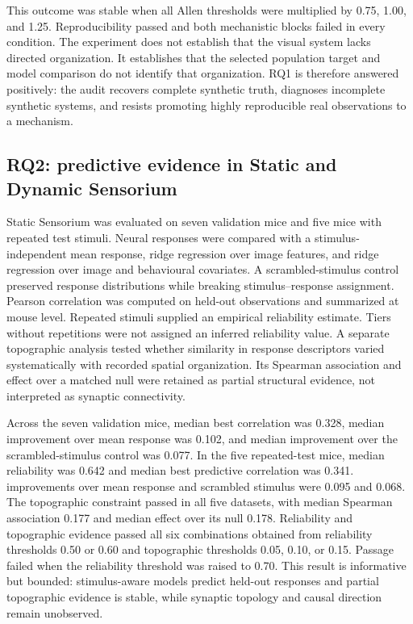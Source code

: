 \documentclass[a4paper,fleqn]{cas-sc}
\begin{document}
This outcome was stable when all Allen thresholds were multiplied by 0.75,
1.00, and 1.25. Reproducibility passed and both mechanistic blocks failed in
every condition. The experiment does not establish that the visual system lacks
directed organization. It establishes that the selected population target and
model comparison do not identify that organization. RQ1 is therefore answered
positively: the audit recovers complete synthetic truth, diagnoses incomplete
synthetic systems, and resists promoting highly reproducible real observations
to a mechanism.

\subsection{RQ2: predictive evidence in Static and Dynamic Sensorium}
\label{subsec:rq2-sensorium}

Static Sensorium was evaluated on seven validation mice and five mice with
repeated test stimuli. Neural responses were compared with a
stimulus-independent mean response, ridge regression over image features, and
ridge regression over image and behavioural covariates. A scrambled-stimulus
control preserved response distributions while breaking stimulus--response
assignment. Pearson correlation was computed on held-out observations and
summarized at mouse level. Repeated stimuli supplied an empirical reliability
estimate. Tiers without repetitions were not assigned an inferred reliability
value. A separate topographic analysis tested whether similarity in response
descriptors varied systematically with recorded spatial organization. Its
Spearman association and effect over a matched null were retained as partial
structural evidence, not interpreted as synaptic connectivity.

Across the seven validation mice, median best correlation was 0.328, median
improvement over mean response was 0.102, and median improvement over the
scrambled-stimulus control was 0.077. In the five repeated-test mice, median
reliability was 0.642 and median best predictive correlation was 0.341.
improvements over mean response and scrambled stimulus were 0.095 and 0.068.
The topographic constraint passed in all five datasets, with median Spearman
association 0.177 and median effect over its null 0.178. Reliability and
topographic evidence passed all six combinations obtained from reliability
thresholds 0.50 or 0.60 and topographic thresholds 0.05, 0.10, or 0.15. Passage
failed when the reliability threshold was raised to 0.70. This result is
informative but bounded: stimulus-aware models predict held-out responses and
partial topographic evidence is stable, while synaptic topology and causal
direction remain unobserved.
\end{document}

